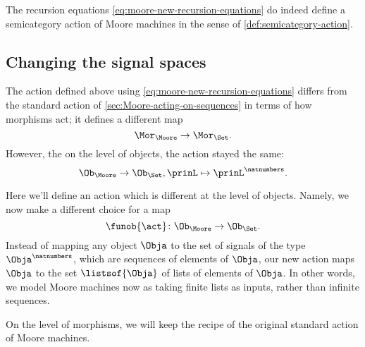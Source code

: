 

\begin{lemma}
The recursion equations \cref{eq:moore-new-recursion-equations} do indeed define a semicategory action of Moore machines in the sense of \cref{def:semicategory-action}. 
\end{lemma}



\subsection{Changing the signal spaces}


The action defined above using \cref{eq:moore-new-recursion-equations} differs from the standard action of \cref{sec:Moore-acting-on-sequences} in terms of how morphisms act; it defines a different map
\begin{equation}
\Mor_\Moore \to \Mor_\Set.
\end{equation}
However, the on the level of objects, the action stayed the same: 
\begin{equation}
 \Ob_{\Moore} \to \Ob_{\Set}, \prinL \mapsto \prinL^\natnumbers.
\end{equation}

Here we'll define an action which is different at the level of objects. Namely, we now make a different choice for a map
\begin{equation}
\funob{\act} \colon \Ob_{\Moore} \to \Ob_{\Set}.
\end{equation}
Instead of mapping any object $\Obja$ to the set of signals of the type $\Obja^\natnumbers$, which are sequences of elements of $\Obja$, our new action maps $\Obja$ to the set $\listsof{\Obja}$ of lists of elements of $\Obja$. In other words, we model Moore machines now as taking finite lists as inputs, rather than infinite sequences. 

On the level of morphisms, we will keep the recipe of the original standard action of Moore machines.

